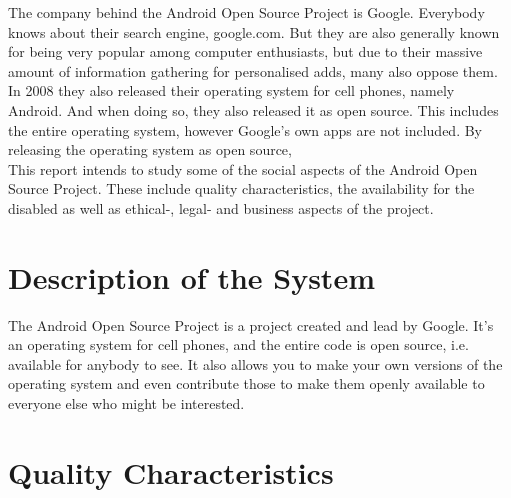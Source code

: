 \documentclass[conference]{IEEEtran}
\begin{document}

The company behind the Android Open Source Project is Google. Everybody knows about their search engine, google.com. But they are also generally known for being very popular among computer enthusiasts, but due to their massive amount of information gathering for personalised adds, many also oppose them. In 2008 they also released their operating system for cell phones, namely Android\cite{android-release}. And when doing so, they also released it as open source. This includes the entire operating system, however Google's own apps are not included. By releasing the operating system as open source, 
\\
This report intends to study some of the social aspects of the Android Open Source Project. These include quality characteristics, the availability for the disabled as well as ethical-, legal- and business aspects of the project. 


\section{Description of the System}
\label{system}

The Android Open Source Project is a project created and lead by Google. It's an operating system for cell phones, and the entire code is open source, i.e. available for anybody to see. It also allows you to make your own versions of the operating system and even contribute those to make them openly available to everyone else who might be interested.


\section{Quality Characteristics}
\label{quality}
\end{document}
